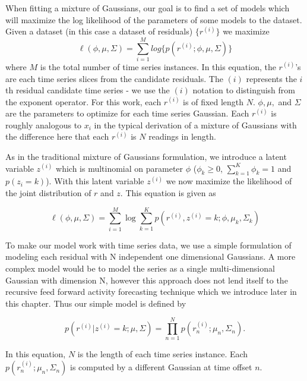 When fitting a mixture of Gaussians, our goal is to find a set of models which will maximize the log likelihood of the parameters of some models to the dataset.  Given a dataset (in this case a dataset of residuals) $\{r^{(i)}\}$ we maximize
\begin{equation}
\ell(\phi, \mu, \Sigma) = \sum_{i = 1}^{M}log\{p(r^{(i)};\phi, \mu, \Sigma)\}
\end{equation}
\noindent 
where ${M}$ is the total number of time series instances.  In this equation, the $r^{(i)}$'s are each time series slices from the candidate residuals.  The $(i)$ represents the $i$th residual candidate time series - we use the $(i)$ notation to distinguish from the exponent operator.  For this work, each $r^{(i)}$ is of fixed length $N$.  $\phi, \mu,$ and $\Sigma$ are the parameters to optimize for each time series Gaussian.  Each $r^{(i)}$ is roughly analogous to $x_{i}$ in the typical derivation of a mixture of Gaussians with the difference here that each $r^{(i)}$ is $N$ readings in length.

As in the traditional mixture of Gaussians formulation, we introduce a latent variable $z^{(i)}$ which is multinomial on parameter $\phi$ ($\phi_{k} \ge 0$,  $\sum_{k=1}^{K}{ \phi_{k}} = 1$ and $p(z_{i} = k)$).  With this latent variable $z^{(i)}$ we now maximize the likelihood of the joint distribution of $r$ and $z$.  This equation is given as 

\begin{equation}
\ell(\phi, \mu, \Sigma) = \sum_{i = 1}^{M}\log \sum_{k = 1}^{K}p(r^{(i)}, z^{(i)} = k;\phi, \mu_{k}, \Sigma_{k})
\end{equation}

To make our model work with time series data, we use a simple formulation of modeling each residual with N independent one dimensional Gaussians.  A more complex model would be to model the series as a single multi-dimensional Gaussian with dimension N, however this approach does not lend itself to the recursive feed forward activity forecasting technique which we introduce later in this chapter.  Thus our simple model is defined by

\begin{equation}
\label{eq:model}
p(r^{(i)}|z^{(i)} = k;\mu, \Sigma) = \prod_{n = 1}^{N}p(r^{(i)}_{n};\mu_{n}, \Sigma_{n}).
\end{equation}
\noindent

In this equation, $N$ is the length of each time series instance.  Each $p(r^{(i)}_{n};\mu_{n}, \Sigma_{n})$ is computed by a different Gaussian at time offset $n$. 

